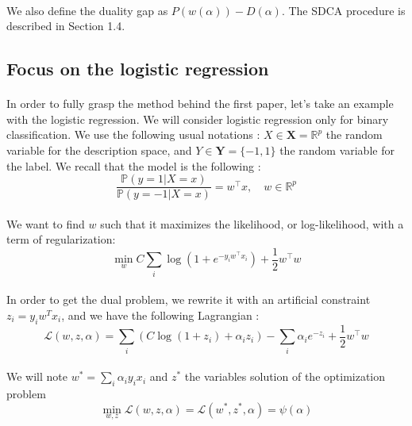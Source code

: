 \documentclass{article}
\begin{document}
\paragraph{}We also define the duality gap as $P(w(\alpha)) - D(\alpha)$. The SDCA procedure is described in Section 1.4.



\subsection{Focus on the logistic regression}

\paragraph{}In order to fully grasp the method behind the first paper, let's take an example with the logistic regression. We will consider logistic regression only for binary classification. We use the following usual notations : $X \in \mathbf{X} = \mathbb{R}^p$ the random variable for the description space, and $Y \in \mathbf{Y} = \{-1,1\}$ the random variable for the label. We recall that the model is the following :
\begin{equation}
	\frac{\mathbb{P}(y=1 | X=x)}{\mathbb{P}(y=-1 |X=x)} = w^\top x, \quad w \in \mathbb{R}^p
\end{equation}

\paragraph{}We want to find $w$ such that it maximizes the likelihood, or log-likelihood, with a term of regularization:
\begin{equation}
	\min_w C \sum_i \log\left(1 + e^{-y_iw^\top x_i}\right)  + \frac{1}{2} w^\top w
\end{equation}

\paragraph{}In order to get the dual problem, we rewrite it with an artificial constraint $z_i = y_iw^Tx_i$, and we have the following Lagrangian :
\begin{equation}
	\mathcal{L}(w, z, \alpha) = \sum_i (C \log\left(1+z_i\right) + \alpha_i z_i) - \sum_i \alpha_i e^{-z_i} + \frac{1}{2}w^\top w 
\end{equation}

\paragraph{}We will note $w^* = \sum_i \alpha_i y_i x_i$ and $z^*$ the variables solution of the optimization problem
\begin{equation}
	\min_{w, z} \mathcal{L}(w, z, \alpha) = \mathcal{L}(w^*, z^*, \alpha) = \psi(\alpha) 
\end{equation}
\end{document}
